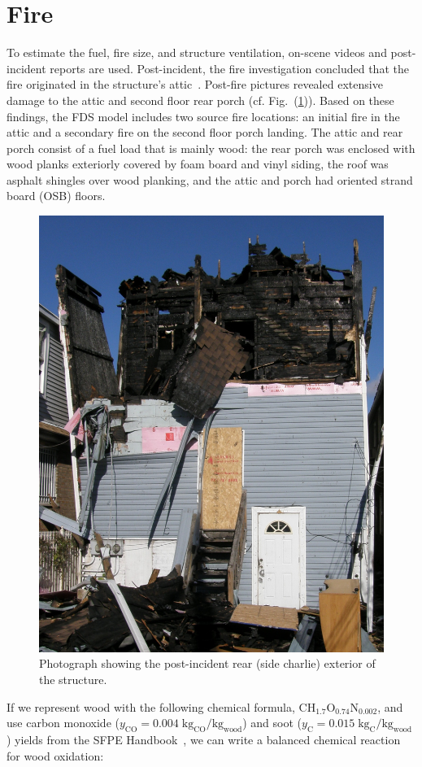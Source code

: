 \documentclass[11pt,oneside]{book}
\renewcommand{\C}{\mbox{C}}
\renewcommand{\H}{\mbox{H}}
\renewcommand{\O}{\mbox{O}}
\newcommand{\N}{\mbox{N}}
\begin{document}
\section{Fire}
\label{fire}

To estimate the fuel, fire size, and structure ventilation, on-scene videos and post-incident reports are used. Post-incident, the fire investigation concluded that the fire originated in the structure's attic~\cite{NIOSH:Bowyer}. Post-fire pictures revealed extensive damage to the attic and second floor rear porch (cf. Fig.~(\ref{fig:charlie_ex})). Based on these findings, the FDS model includes two source fire locations: an initial fire in the attic and a secondary fire on the second floor porch landing. The attic and rear porch consist of a fuel load that is mainly wood: the rear porch was enclosed with wood planks exteriorly covered by foam board and vinyl siding, the roof was asphalt shingles over wood planking, and the attic and porch had oriented strand board (OSB) floors.  

\begin{figure}[h!]
\centering
\includegraphics[width=.65\textwidth]{../Figures/exterior_charlie}
\caption{Photograph showing the post-incident rear (side charlie) exterior of the structure.}
\label{fig:charlie_ex}
\end{figure}


If we represent wood with the following chemical formula, $\C\H_{1.7}\O_{0.74}\N_{0.002}$, and use carbon monoxide ($y_{\mathrm{CO}}=0.004 \; {\mathrm{kg_{CO}}/\mathrm{kg_{wood}}}$) and soot ($y_{\mathrm{C}}=0.015 \; {\mathrm{kg_{C}}/\mathrm{kg_{wood}}}$) yields from the SFPE Handbook~\cite{SFPE:Tewarson}, we can write a balanced chemical reaction for wood oxidation:
\end{document}
